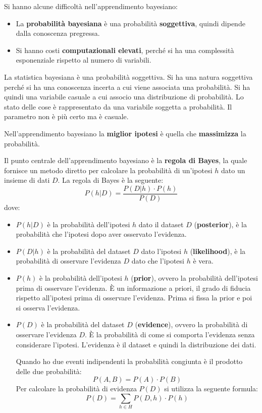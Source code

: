 Si hanno alcune difficoltà nell'apprendimento bayesiano:
\begin{itemize}
    \item La \textbf{probabilità bayesiana} è una probabilità \textbf{soggettiva},
          quindi dipende dalla conoscenza pregressa.
    \item Si hanno costi \textbf{computazionali elevati}, perché si ha una complessità
          esponenziale rispetto al numero di variabili.
\end{itemize}
La statistica bayesiana è una probabilità soggettiva. Si ha una natura soggettiva
perché si ha una conoscenza incerta a cui viene associata una probabilità. Si
ha quindi una variabile casuale a cui associo una distribuzione di probabilità.
Lo stato delle cose è rappresentato da una variabile soggetta a probabilità.
Il parametro non è più certo ma è casuale.
\begin{nota}
    Nell'apprendimento bayesiano la \textbf{miglior ipotesi} è quella che
    \textbf{massimizza} la probabilità.
\end{nota}
Il punto centrale dell'apprendimento bayesiano è la \textbf{regola di Bayes},
la quale fornisce un metodo diretto per calcolare la probabilità di un'ipotesi
$h$ dato un insieme di dati $D$. La regola di Bayes è la seguente:
\begin{equation}
    P(h|D) = \frac{P(D|h) \cdot P(h)}{P(D)}
\end{equation}
dove:
\begin{itemize}
    \item $P(h|D)$ è la probabilità dell'ipotesi $h$ dato il dataset $D$
          (\textbf{posterior}), è la probabilità che l'ipotesi dopo aver osservato
          l'evidenza.
    \item $P(D|h)$ è la probabilità del dataset $D$ dato l'ipotesi $h$
          (\textbf{likelihood}), è la probabilità di osservare l'evidenza $D$ 
          dato che l'ipotesi $h$ è vera.
    \item $P(h)$ è la probabilità dell'ipotesi $h$ (\textbf{prior}), ovvero la
          probabilità dell'ipotesi prima di osservare l'evidenza. È un informazione
          a priori, il grado di fiducia rispetto all'ipotesi prima di osservare
          l'evidenza. Prima si fissa la prior e poi si osserva l'evidenza.
    \item $P(D)$ è la probabilità del dataset $D$ (\textbf{evidence}), ovvero
          la probabilità di osservare l'evidenza $D$. È la probabilità di come 
          si comporta l'evidenza senza considerare l'ipotesi. L'evidenza è il 
          dataset e quindi la distribuzione dei dati.

          Quando ho due eventi indipendenti la probabilità congiunta è il prodotto
          delle due probabilità:
          \begin{equation}
              P(A, B) = P(A) \cdot P(B)
          \end{equation}
          Per calcolare la probabilità di evidenza $P(D)$ si utilizza la seguente
          formula:
          \begin{equation}
              P(D) = \sum_{h \in H} P(D, h) \cdot P(h)
          \end{equation}
\end{itemize}
